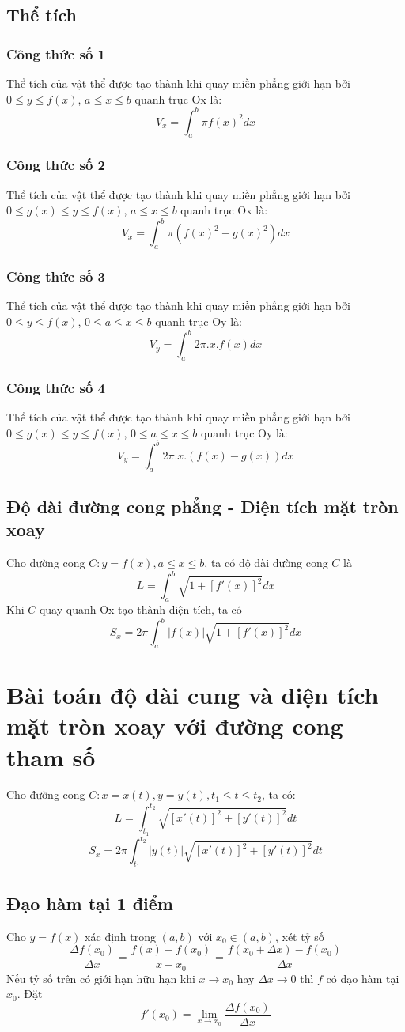 \documentclass[13pt]{article}
\begin{document}
\subsection{Thể tích}
\subsubsection{Công thức số 1}
Thể tích của vật thể được tạo thành khi quay miền phẳng giới hạn bởi $0\leq y\leq f(x)$, $a\leq x\leq b$ quanh trục Ox là: $$V_x=\int_a^b\pi f(x)^2dx$$
\subsubsection{Công thức số 2}
Thể tích của vật thể được tạo thành khi quay miền phẳng giới hạn bởi $0\leq g(x)\leq y\leq f(x)$, $a\leq x\leq b$ quanh trục Ox là:
$$V_x=\int_a^b\pi (f(x)^2-g(x)^2)dx$$
\subsubsection{Công thức số 3}
Thể tích của vật thể được tạo thành khi quay miền phẳng giới hạn bởi $0\leq y\leq f(x)$, $0\leq a\leq x\leq b$ quanh trục Oy là:
$$V_y=\int_a^b2\pi.x.f(x)dx$$ 
\subsubsection{Công thức số 4}
Thể tích của vật thể được tạo thành khi quay miền phẳng giới hạn bởi $0\leq g(x)\leq y\leq f(x)$, $0\leq a\leq x\leq b$ quanh trục Oy là:
$$V_y=\int_a^b2\pi.x.(f(x)-g(x))dx$$
\subsection{Độ dài đường cong phẳng - Diện tích mặt tròn xoay}
Cho đường cong $C:y=f(x),a\leq x\leq b$, ta có độ dài đường cong $C$ là $$L=\int_a^b\sqrt{1+[f'(x)]^2}dx$$
Khi $C$ quay quanh Ox tạo thành diện tích, ta có $$S_x=2\pi\int_a^b|f(x)|\sqrt{1+[f'(x)]^2}dx$$
\section{Bài toán độ dài cung và diện tích mặt tròn xoay với đường cong tham số}
Cho đường cong $C:x=x(t),y=y(t),t_1\leq t\leq t_2$, ta có:
$$L=\int_{t_1}^{t_2}\sqrt{[x'(t)]^2+[y'(t)]^2}dt$$
$$S_x=2\pi\int_{t_1}^{t_2}|y(t)|\sqrt{[x'(t)]^2+[y'(t)]^2}dt$$
\subsection{Đạo hàm tại 1 điểm}
Cho $y=f(x)$ xác định trong $(a,b)$ với $x_0\in(a,b)$, xét tỷ số
$$\frac{\Delta f(x_0)}{\Delta x}=\frac{f(x)-f(x_0)}{x-x_0}=\frac{f(x_0+\Delta x)-f(x_0)}{\Delta x}$$
Nếu tỷ số trên có giới hạn hữu hạn khi $x\to x_0$ hay $\Delta x\to0$ thì $f$ có đạo hàm tại $x_0$. Đặt
$$f'(x_0)=\lim_{x\to x_0}\frac{\Delta f(x_0)}{\Delta x}$$
\newpage
\end{document}
